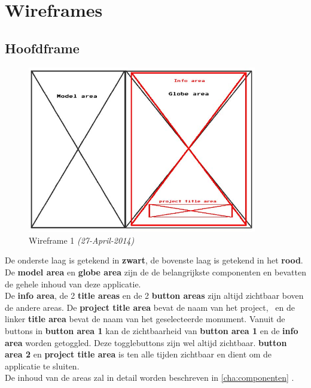 \chapter{Wireframes} \label{cha:wireframes}

\section{Hoofdframe} \label{sec:hoofdframe}
\begin{figure}[h]
  \includegraphics[width=100mm]{figs/wireframe1.jpg}
  \caption{Wireframe 1 \textit{(27-April-2014)}}
  \label{fig:wireframe1}
\end{figure}

De onderste laag is getekend in \textbf{zwart}, de bovenste laag is getekend in het \textbf{{\color{red}rood}}.\\
De \textbf{model area} en \textbf{globe area} zijn de de belangrijkste componenten en bevatten de gehele inhoud van deze applicatie.\\
De \textbf{{\color{red}info area}}, de 2 \textbf{{\color{red}title areas}} en de 2 \textbf{{\color{red}button areas}} zijn altijd zichtbaar boven de andere areas. De \textbf{{\color{red}project title area}} bevat de naam van het project, \projectname\ en de linker \textbf{{\color{red}title area}} bevat de naam van het geselecteerde monument. Vanuit de buttons in \textbf{{\color{red}button area 1}} kan de zichtbaarheid van \textbf{{\color{red}button area 1}} en de \textbf{{\color{red}info area}} worden getoggled. Deze togglebuttons zijn wel altijd zichtbaar. \textbf{{\color{red}button area 2}} en \textbf{{\color{red}project title area}} is ten alle tijden zichtbaar en dient om de applicatie te sluiten.\\
De inhoud van de areas zal in detail worden beschreven in \cref{cha:componenten} .
\newpage
